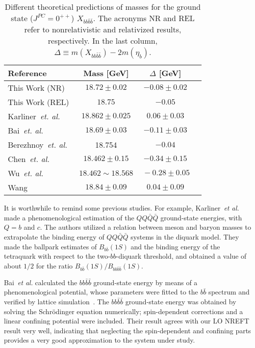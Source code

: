 \documentclass[twocolumn,showpacs,superscriptaddress,preprintnumbers,nofootinbib,prd]{revtex4-1}
\begin{document}
\begin{table}[h] \renewcommand\arraystretch{2} \centering
\begin{tabular}{lccc}
  \hline\hline
  Reference & Mass [GeV] & $\Delta$ [GeV] \\
  \hline
  This Work (NR) & $18.72\pm0.02$ & $-0.08\pm0.02$\\
  This Work (REL) & $18.75$  & $-0.05$ \\
  Karliner~\textit{et. al.}~\cite{Karliner:2016zzc} & $18.862 \pm 0.025$  &
  $0.06\pm0.03$
  \\
  Bai~\textit{et. al.}~\cite{Bai:2016int}& $18.69\pm 0.03$  & $-0.11\pm0.03$\\
  Berezhnoy~\textit{et. al.}~\cite{Berezhnoy:2011xn} & 18.754  & $-0.04$\\
  Chen~\textit{et. al.}~\cite{Chen:2016jxd} & $18.462 \pm 0.15$  &
  $-0.34\pm0.15$
  \\
  Wu~\textit{et. al.}~\cite{Wu:2016vtq} & $18.462\sim 18.568$ &
  $~-0.28\pm0.05$\\
  Wang~\cite{Wang:2017jtz} & $18.84 \pm 0.09$  & $0.04\pm0.09$\\
  \hline\hline
\end{tabular}
\caption{Different theoretical predictions of masses for the ground state
($J^{PC}=0^{++}$) $X_{bb\bar{b}\bar{b}}$. The acronyms NR and REL refer to
nonrelativistic and relativized results, respectively. In the last column,
$\Delta\equiv m(X_{bb\bar{b}\bar{b}})-2m(\eta_b)$.}
\label{results}
\end{table}

It is worthwhile to remind some previous studies.
For example, Karliner~\textit{et al.}~\cite{Karliner:2016zzc}  made a
phenomenological estimation of the $Q Q \bar Q \bar Q$ ground-state energies,
with $Q = b$ and $c$.
The authors utilized a relation between meson and baryon masses to extrapolate
the binding energy of $Q Q \bar Q \bar Q$ systems in the diquark model.
They made the ballpark estimates of $B_{b\bar{b}}(1S)$ and the binding energy of
the tetraquark with respect to the two-$bb$-diquark threshold, and obtained a
value of about $1/2$ for the ratio ${B_{b\bar{b}}(1S)}/{B_{bb\bar{b}\bar{b}}(1S)}$.

Bai~\textit{et al.} calculated the $b b \bar b \bar b$ ground-state energy by
means of a phenomenological potential, whose parameters were fitted to the $b
\bar b$ spectrum and verified by lattice simulation~\cite{Bai:2016int}. The $b b
\bar b \bar b$ ground-state energy was obtained by solving the Schr\"odinger
equation numerically; spin-dependent corrections and a linear confining
potential were included.
Their result agrees with our LO NREFT result very well, indicating that
neglecting the spin-dependent and confining parts provides a very good
approximation to the system under study.
\end{document}
